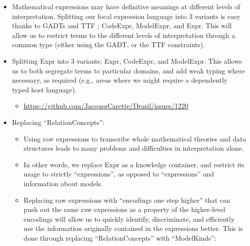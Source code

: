 \begin{itemize}

	\item Mathematical expressions may have definitive meanings at different
	      levels of interpretation. Splitting our focal expression language into
	      3 variants is easy thanks to GADTs and TTF \cite{Carette2009};
	      CodeExpr, ModelExpr, and Expr. This will allow us to restrict terms to
	      the different levels of interpretation through a common type (either
	      using the GADT, or the TTF constraints).

	\item Splitting Expr into 3 variants; Expr, CodeExpr, and ModelExpr. This
	      allows us to both segregate terms to particular domains, and add weak
	      typing where necessary, as required (e.g., areas where we might
	      require a dependently typed host language).

	      \begin{itemize}

		      \item
		            \url{https://github.com/JacquesCarette/Drasil/issues/1220}

	      \end{itemize}


	\item Replacing ``RelationConcepts'':

	      \begin{itemize}

		      \item Using raw expressions to transcribe whole mathematical
		            theories and data structures leads to many problems and
		            difficulties in interpretation alone.

		      \item In other words, we replace Expr as a knowledge container,
		            and restrict its usage to strictly ``expressions'', as
		            opposed to ``expressions'' and information about models.

		      \item Replacing raw expressions with ``encodings one step higher''
		            that can push out the same raw expressions as a property of
		            the higher-level encodings will allow us to quickly
		            identify, discriminate, and efficiently use the information
		            originally contained in the expressions better. This is done
		            through replacing ``RelationConcepts'' with ``ModelKinds'':


\end{itemize}
\end{itemize}
